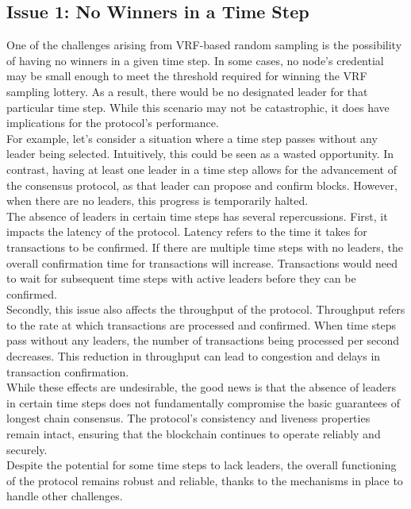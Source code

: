 \subsection{Issue 1: No Winners in a Time Step}
One of the challenges arising from VRF-based random sampling is the possibility of having no winners in a given time step. In some cases, no node's credential may be small enough to meet the threshold required for winning the VRF sampling lottery. As a result, there would be no designated leader for that particular time step. While this scenario may not be catastrophic, it does have implications for the protocol's performance.\\
For example, let's consider a situation where a time step passes without any leader being selected. Intuitively, this could be seen as a wasted opportunity. In contrast, having at least one leader in a time step allows for the advancement of the consensus protocol, as that leader can propose and confirm blocks. However, when there are no leaders, this progress is temporarily halted.\\
The absence of leaders in certain time steps has several repercussions. First, it impacts the latency of the protocol. Latency refers to the time it takes for transactions to be confirmed. If there are multiple time steps with no leaders, the overall confirmation time for transactions will increase. Transactions would need to wait for subsequent time steps with active leaders before they can be confirmed.\\
Secondly, this issue also affects the throughput of the protocol. Throughput refers to the rate at which transactions are processed and confirmed. When time steps pass without any leaders, the number of transactions being processed per second decreases. This reduction in throughput can lead to congestion and delays in transaction confirmation.\\
While these effects are undesirable, the good news is that the absence of leaders in certain time steps does not fundamentally compromise the basic guarantees of longest chain consensus. The protocol's consistency and liveness properties remain intact, ensuring that the blockchain continues to operate reliably and securely.\\
Despite the potential for some time steps to lack leaders, the overall functioning of the protocol remains robust and reliable, thanks to the mechanisms in place to handle other challenges.

